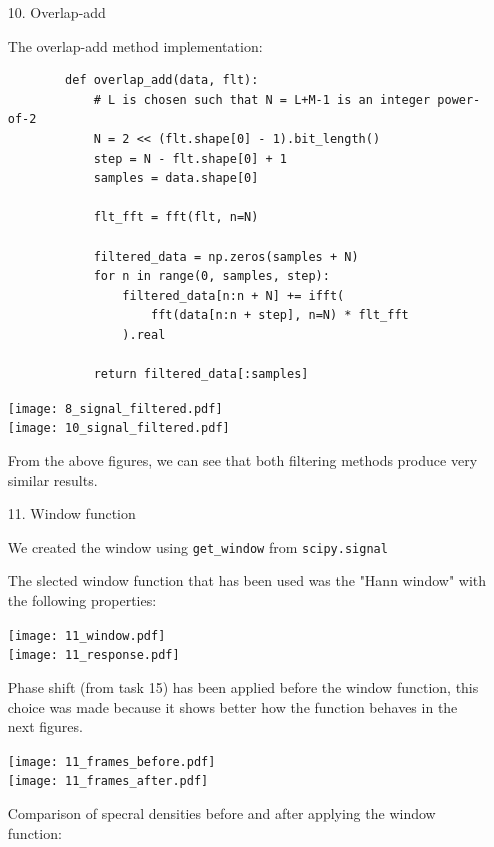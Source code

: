 \documentclass[a4paper, 11pt]{article}
\begin{document}
    \begin{enumerate}
        \item[10.]
        Overlap-add

        The overlap-add method implementation:

        \begin{verbatim}
        def overlap_add(data, flt):
            # L is chosen such that N = L+M-1 is an integer power-of-2
            N = 2 << (flt.shape[0] - 1).bit_length()
            step = N - flt.shape[0] + 1
            samples = data.shape[0]

            flt_fft = fft(flt, n=N)

            filtered_data = np.zeros(samples + N)
            for n in range(0, samples, step):
                filtered_data[n:n + N] += ifft(
                    fft(data[n:n + step], n=N) * flt_fft
                ).real

            return filtered_data[:samples]
        \end{verbatim}

        \texttt{[image: 8\_signal\_filtered.pdf]} \\
        \texttt{[image: 10\_signal\_filtered.pdf]}

        From the above figures, we can see that both filtering methods produce very similar results.

        \newpage
        \item[11.]
        Window function

        We created the window using \texttt{get\_window} from \texttt{scipy.signal}

        The slected window function that has been used was the "Hann window" with the following properties:

        \texttt{[image: 11\_window.pdf]} \\
        \texttt{[image: 11\_response.pdf]}

        Phase shift (from task 15) has been applied before the window function,
        this choice was made because it shows better how the function behaves in the next figures.

        \texttt{[image: 11\_frames\_before.pdf]} \\
        \texttt{[image: 11\_frames\_after.pdf]}

        \newpage
        Comparison of specral densities before and after applying the window function:


\end{enumerate}
\end{document}
